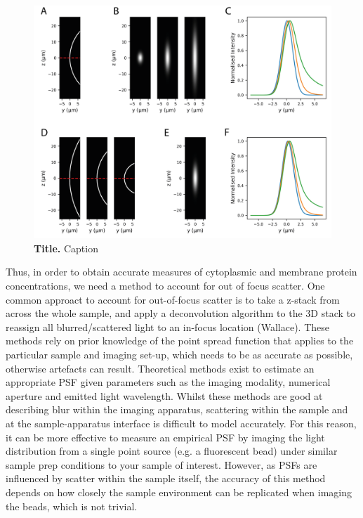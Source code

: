 \documentclass[12pt]{"article"}
\newcommand{\mycaption}[2]{\caption[#1]{\textbf{#1.} #2}}
\begin{document}
\begin{figure}[!h]
\includegraphics[scale=0.9]{memquant_mem_psf}
\setlength{\abovecaptionskip}{20pt}
\centering
\mycaption{Title}{Caption}
\end{figure}

Thus, in order to obtain accurate measures of cytoplasmic and membrane protein concentrations, we need a method to account for out of focus scatter. One common approact to account for out-of-focus scatter is to take a z-stack from across the whole sample, and apply a deconvolution algorithm to the 3D stack to reassign all blurred/scattered light to an in-focus location (Wallace). These methods rely on prior knowledge of the point spread function that applies to the particular sample and imaging set-up, which needs to be as accurate as possible, otherwise artefacts can result. Theoretical methods exist to estimate an appropriate PSF given parameters such as the imaging modality, numerical aperture and emitted light wavelength. Whilst these methods are good at describing blur within the imaging apparatus, scattering within the sample and at the sample-apparatus interface is difficult to model accurately. For this reason, it can be more effective to measure an empirical PSF by imaging the light distribution from a single point source (e.g. a fluorescent bead) under similar sample prep conditions to your sample of interest. However, as PSFs are influenced by scatter within the sample itself, the accuracy of this method depends on how closely the sample environment can be replicated when imaging the beads, which is not trivial. \\
\end{document}
